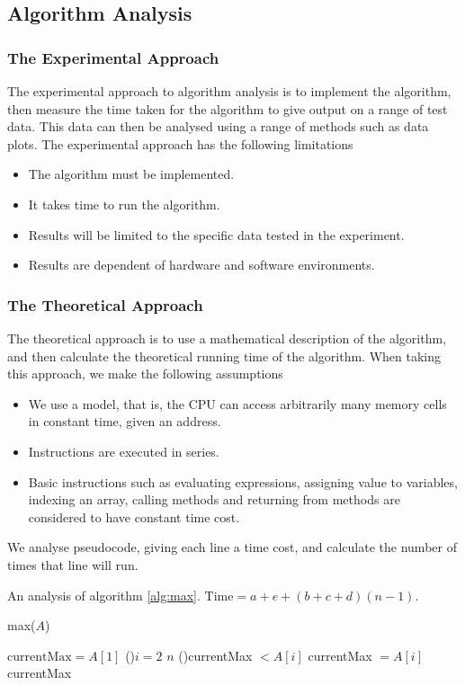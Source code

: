 \documentclass[11pt]{report}
\begin{document}
\subsection{Algorithm Analysis}
\subsubsection{The Experimental Approach}
The experimental approach to algorithm analysis is to implement the algorithm, then measure the time taken for the algorithm to give output on a range of test data. This data can then be analysed using a range of methods such as data plots.
\mypar The experimental approach has the following limitations
\begin{itemize}
    \item The algorithm must be implemented.
    \item It takes time to run the algorithm.
    \item Results will be limited to the specific data tested in the experiment.
    \item Results are dependent of hardware and software environments.
\end{itemize}
\subsubsection{The Theoretical Approach}
The theoretical approach is to use a mathematical description of the algorithm, and then calculate the theoretical running time of the algorithm. When taking this approach, we make the following assumptions
\begin{itemize}
    \item We use a  model, that is, the CPU can access arbitrarily many memory cells in constant time, given an address.
    \item Instructions are executed in series.
    \item Basic instructions such as evaluating expressions, assigning value to variables, indexing an array, calling methods and returning from methods are considered to have constant time cost.
\end{itemize}
We analyse pseudocode, giving each line a time cost, and calculate the number of times that line will run.
\begin{eg}
    An analysis of algorithm \ref{alg:max}. $\text{Time} = a+e + (b+c+d)(n-1)$.\\
    \begin{algorithm}[H]
        \caption{max($A$)} 
        $\text{currentMax} = A[1]$
        \For(){$i = 2$ \KwTo $n$}
        {\If(){currentMax $< A[i]$}
            {
                currentMax $= A[i]$ 
            }
        }
        \Return currentMax 
    \end{algorithm}
\end{eg}
\pagebreak
\end{document}
